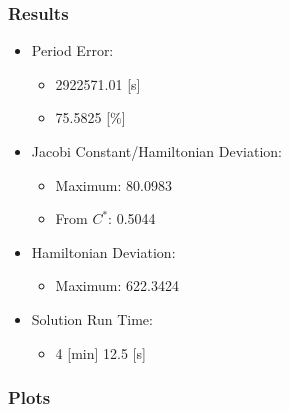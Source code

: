 \documentclass{article}
\begin{document}
\subsubsection{Results}

\begin{itemize}
    \item Period Error:
    \begin{itemize}
        \item 2922571.01 [s]
        \item 75.5825 [\%]
    \end{itemize}
    \item Jacobi Constant/Hamiltonian Deviation:
    \begin{itemize}
        \item Maximum: \num{80.0983}
        \item From $C^*$: \num{0.5044}
    \end{itemize}
    \item Hamiltonian Deviation:
    \begin{itemize}
        \item Maximum: \num{622.3424}
    \end{itemize}
    \item Solution Run Time:
    \begin{itemize}
        \item 4 [min] 12.5 [s]
    \end{itemize}  
\end{itemize}

\newpage

\subsubsection{Plots}
\end{document}
